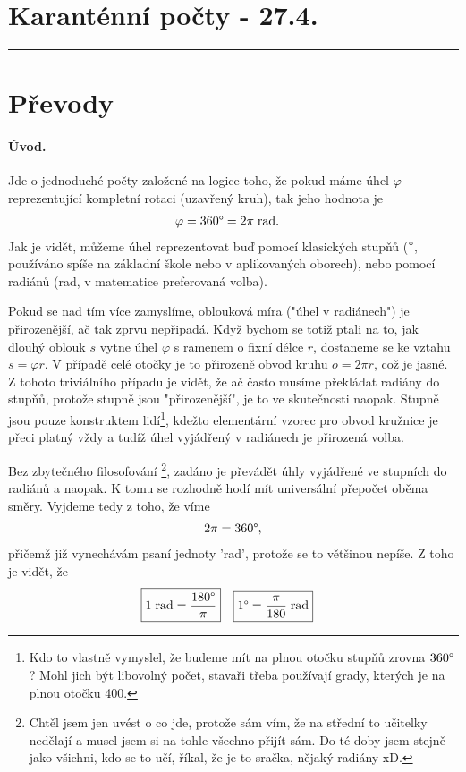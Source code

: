\documentclass[11pt, a4paper]{article}
\begin{document}
	
	
	\section*{Karanténní počty - 27.4.}
	\noindent\rule{12cm}{0.2pt}
	
	\section*{Převody}
		
		\paragraph{Úvod.} Jde o jednoduché počty založené na logice toho, že pokud máme úhel $\varphi$ reprezentující kompletní rotaci (uzavřený kruh), tak jeho hodnota je
		\begin{align*}
			\varphi &= 360\degree = 2\pi \; \mathrm{rad}.
		\end{align*}
		Jak je vidět, můžeme úhel reprezentovat buď pomocí klasických stupňů ($\degree$, používáno spíše na základní škole nebo v aplikovaných oborech), nebo pomocí radiánů (rad, v matematice preferovaná volba).
		
		Pokud se nad tím více zamyslíme, oblouková míra ("úhel v radiánech") je přirozenější, ač tak	 zprvu nepřipadá. Když bychom se totiž ptali na to, jak dlouhý oblouk $s$ vytne úhel $\varphi$ s ramenem o fixní délce $r$, dostaneme se ke vztahu $s=\varphi r$. V případě celé otočky je to přirozeně obvod kruhu $o=2\pi r$, což je jasné. Z tohoto triviálního případu je vidět, že ač často musíme překládat radiány do stupňů, protože stupně jsou "přirozenější", je to ve skutečnosti naopak. Stupně jsou pouze konstruktem lidí\footnote{Kdo to vlastně vymyslel, že budeme mít na plnou otočku stupňů zrovna $360\degree$? Mohl jich být libovolný počet, stavaři třeba používají grady, kterých je na plnou otočku 400.}, kdežto elementární vzorec pro obvod kružnice je přeci platný vždy a tudíž úhel vyjádřený v radiánech je přirozená volba.
		
		Bez zbytečného filosofování \footnote{Chtěl jsem jen uvést o co jde, protože sám vím, že na střední to učitelky nedělají a musel jsem si na tohle všechno přijít sám. Do té doby jsem stejně jako všichni, kdo se to učí, říkal, že je to sračka, nějaký radiány xD.}, zadáno je převádět úhly vyjádřené ve stupních do radiánů a naopak. K tomu se rozhodně hodí mít universální přepočet oběma směry. Vyjdeme tedy z toho, že víme
		\begin{align*}
			2\pi = 360 \degree,
		\end{align*}
		přičemž již vynechávám psaní jednoty 'rad', protože se to většinou nepíše. Z toho je vidět, že
		\begin{align*}
			\Aboxed{1 \; \mathrm{rad} &= \frac{180\degree}{\pi}} & \Aboxed{1\degree &= \frac{\pi}{180} \; \mathrm{rad}}
		\end{align*}
		
\end{document}
